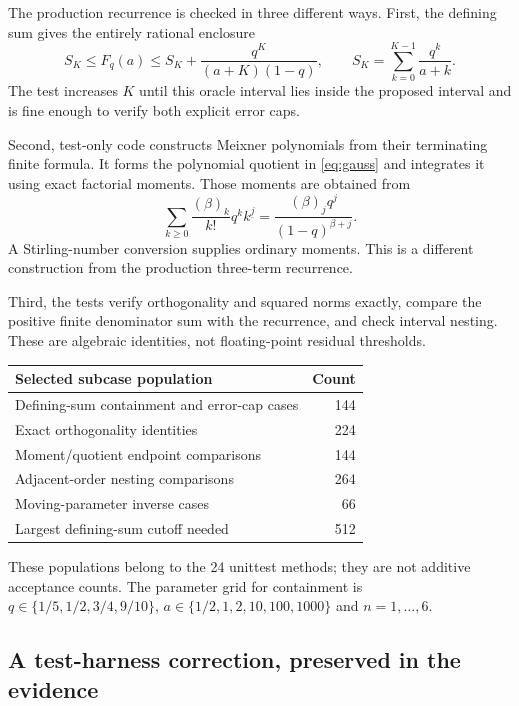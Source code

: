\documentclass[11pt,a4paper]{article}
\theoremstyle{remark}\newtheorem{remark}[theorem]{Remark}
\begin{document}
The production recurrence is checked in three different ways.
First, the defining sum gives the entirely rational enclosure
\begin{equation}
 S_K\leq F_q(a)\leq S_K+
 \frac{q^K}{(a+K)(1-q)},\qquad
 S_K=\sum_{k=0}^{K-1}\frac{q^k}{a+k}.
 \label{eq:sum-oracle}
\end{equation}
The test increases $K$ until this oracle interval lies inside the proposed
interval and is fine enough to verify both explicit error caps.

Second, test-only code constructs Meixner polynomials from their terminating
finite formula. It forms the polynomial quotient in \cref{eq:gauss} and
integrates it using exact factorial moments. Those moments are obtained from
\[
 \sum_{k\geq0}\frac{(\beta)_k}{k!}q^k
 k^{\underline j}
 =\frac{(\beta)_j q^j}{(1-q)^{\beta+j}}.
\]
A Stirling-number conversion supplies ordinary moments. This is a different
construction from the production three-term recurrence.

Third, the tests verify orthogonality and squared norms exactly, compare the
positive finite denominator sum with the recurrence, and check interval nesting.
These are algebraic identities, not floating-point residual thresholds.

\begin{center}
\begin{tabular}{@{}lr@{}}\toprule
Selected subcase population & Count\\\midrule
Defining-sum containment and error-cap cases & 144\\
Exact orthogonality identities & 224\\
Moment/quotient endpoint comparisons & 144\\
Adjacent-order nesting comparisons & 264\\
Moving-parameter inverse cases & 66\\
Largest defining-sum cutoff needed & 512\\
\bottomrule\end{tabular}
\end{center}
These populations belong to the 24 unittest methods; they are not additive
acceptance counts. The parameter grid for containment is
$q\in\{1/5,1/2,3/4,9/10\}$,
$a\in\{1/2,1,2,10,100,1000\}$ and $n=1,\ldots,6$.

\subsection{A test-harness correction, preserved in the evidence}
\end{document}
